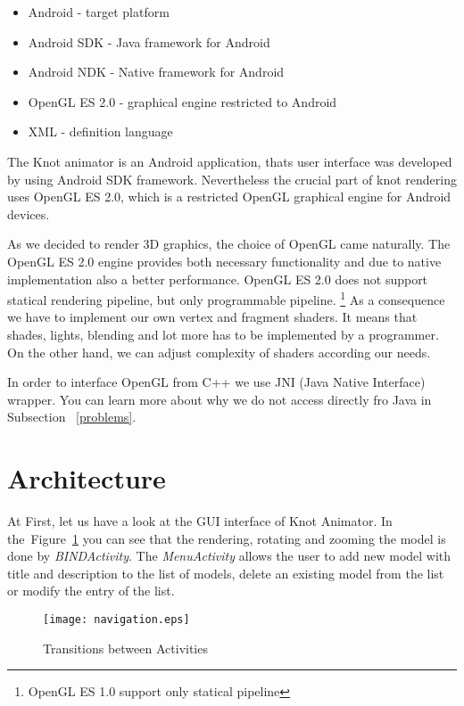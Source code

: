 \begin{itemize}
  \item Android - target platform 
  \item Android SDK - Java framework for Android
  \item Android NDK - Native framework for Android
  \item OpenGL ES 2.0 - graphical engine restricted to Android
  \item XML - definition language 
\end{itemize}

The Knot animator is an Android application, 
thats user interface was developed by using Android SDK framework.
Nevertheless the crucial part of knot rendering uses OpenGL ES 2.0,
which is a restricted OpenGL graphical engine for Android devices.

As we decided to render 3D graphics, the choice of OpenGL came naturally.
The OpenGL ES 2.0 engine provides both necessary functionality and due to
native implementation also a better performance.
OpenGL ES 2.0 does not support statical rendering pipeline, 
but only programmable pipeline. \footnote{OpenGL ES 1.0 support only statical pipeline}
As a consequence we have to implement our own vertex and fragment shaders.
It means that shades, lights, blending and lot more has to be implemented by a programmer.
On the other hand, we can adjust complexity of shaders according our needs.

In order to interface OpenGL from C++ we use JNI (Java Native Interface) wrapper.
You can learn more about why we do not access directly fro Java in Subsection ~\ref{problems}.


\section*{Architecture} %
\label{sec:Architecture}


At First, let us have a look at the GUI interface of Knot Animator.
In the~Figure~\ref{pic:navigation} you can see that the rendering, rotating and zooming the model
is done by {\it BINDActivity}. The {\it MenuActivity} allows the user to add new model with title
and description to the list of models, delete an existing model from the list or modify the entry of the list.

\begin{figure}
\begin{center}
\texttt{[image: navigation.eps]}
\label{pic:navigation}
\caption{Transitions between Activities}
\end{center}
\end{figure}


